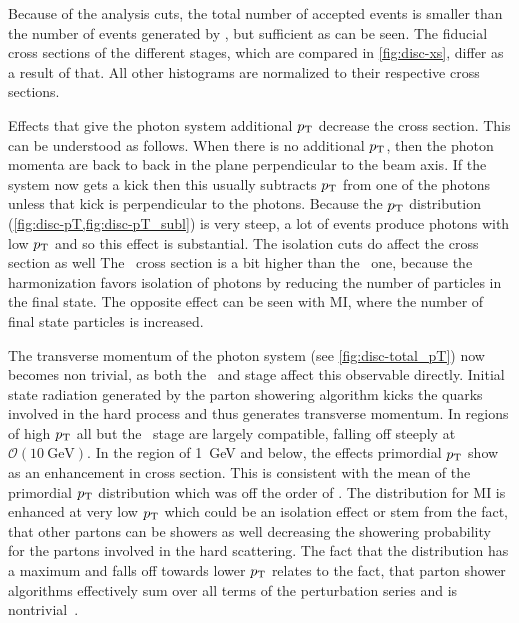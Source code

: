 Because of the analysis cuts, the total number of accepted events is
smaller than the number of events generated by \sherpa, but sufficient
as can be seen. The fiducial cross sections of the different stages,
which are compared in \cref{fig:disc-xs}, differ as a result of
that. All other histograms are normalized to their respective cross
sections.

Effects that give the photon system additional $p_\mathrm{T}$ decrease the
cross section. This can be understood as follows. When there is no
additional \(p_\mathrm{T}\), then the photon momenta are back to back in the
plane perpendicular to the beam axis. If the system now gets a kick
then this usually subtracts \(p_\mathrm{T}\) from one of the photons unless
that kick is perpendicular to the photons. Because the \(p_\mathrm{T}\)
distribution (\cref{fig:disc-pT,fig:disc-pT_subl}) is very steep, a
lot of events produce photons with low \(p_\mathrm{T}\) and so this effect is
substantial. The isolation cuts do affect the cross section as well
The \stfour\ cross section is a bit higher than the \stthree\ one,
because the harmonization favors isolation of photons by reducing the
number of particles in the final state. The opposite effect can be
seen with MI, where the number of final state particles is increased.

The transverse momentum of the photon system (see
\cref{fig:disc-total_pT}) now becomes non trivial, as both the \sttwo\
and \stthree stage affect this observable directly. Initial state
radiation generated by the parton showering algorithm kicks the quarks
involved in the hard process and thus generates transverse
momentum. In regions of high \(p_\mathrm{T}\) all but the \stone\ stage are
largely compatible, falling off steeply at
\(\mathcal{O}(\SI{10}{\giga\electronvolt})\). In the region of
\SI{1}{\giga\electronvolt} and below, the effects primordial \(p_\mathrm{T}\)
show as an enhancement in cross section. This is consistent with the
mean of the primordial \(p_\mathrm{T}\) distribution which was off the order of
\gev{1}. The distribution for MI is enhanced at very low \(p_\mathrm{T}\) which
could be an isolation effect or stem from the fact, that other partons
can be showers as well decreasing the showering probability for the
partons involved in the hard scattering.
The fact that the distribution has a maximum and falls off towards
lower \(p_\mathrm{T}\) relates to the fact, that parton shower algorithms
effectively sum over all terms of the perturbation series and is
nontrivial~\cite{buckley:2011ge}.

